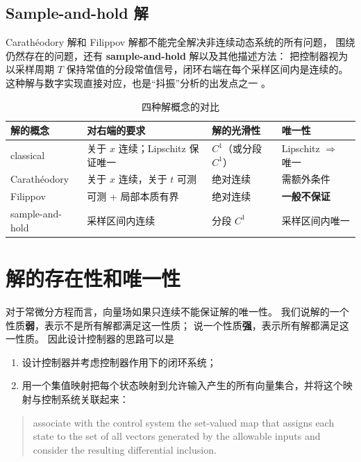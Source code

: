 \subsection{Sample-and-hold 解}

Carathéodory 解和 Filippov 解都不能完全解决非连续动态系统的所有问题，
围绕仍然存在的问题，还有 \textbf{sample-and-hold} 解以及其他描述方法：
把控制器视为以采样周期 $T$ 保持常值的分段常值信号，闭环右端在每个采样区间内是连续的。
这种解与数字实现直接对应，也是“抖振”分析的出发点之一 \cite{cortesDiscontinuousDynamicalSystems2008}。

\begin{table}[!htb]
  \centering
  \small
  \begin{tabular}{@{}p{2.6cm}|p{4.2cm}|p{3.8cm}|p{3.5cm}@{}}
    \hline
    解的概念 & 对右端的要求 & 解的光滑性 & 唯一性 \\
    \hline
    classical & 关于 $x$ 连续；Lipschitz 保证唯一 & $C^1$（或分段 $C^1$） & Lipschitz $\Rightarrow$ 唯一 \\
    \hline
    Carathéodory & 关于 $x$ 连续，关于 $t$ 可测 & 绝对连续 & 需额外条件 \\
    \hline
    Filippov & 可测 + 局部本质有界 & 绝对连续 & \textbf{一般不保证} \\
    \hline
    sample-and-hold & 采样区间内连续 & 分段 $C^1$ & 采样区间内唯一 \\
    \hline
  \end{tabular}
  \caption{四种解概念的对比 \cite{cortesDiscontinuousDynamicalSystems2008}}
  \label{tab:solution-concepts-nonsmooth}
\end{table}

\section{解的存在性和唯一性}\label{sec:nonsmooth-existence}

对于常微分方程而言，向量场如果只连续不能保证解的唯一性。
我们说解的一个性质\textbf{弱}，表示不是所有解都满足这一性质；
说一个性质\textbf{强}，表示所有解都满足这一性质。
因此设计控制器的思路可以是
\begin{enumerate}
  \item 设计控制器并考虑控制器作用下的闭环系统；
  \item 用一个集值映射把每个状态映射到允许输入产生的所有向量集合，并将这个映射与控制系统关联起来：
\end{enumerate}
\begin{quote}
associate with the control system the set-valued map that assigns each state to the set of all vectors generated by the allowable inputs and consider the resulting differential inclusion.
\end{quote}

